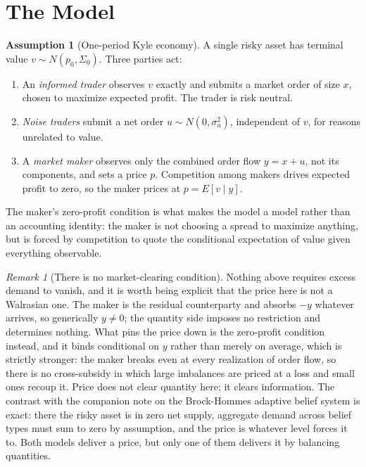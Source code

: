 \documentclass[11pt]{article}
\theoremstyle{remark}
\newtheorem*{remark}{Remark}
\theoremstyle{definition}
\newtheorem{assumption}{Assumption}
\begin{document}
\section{The Model}
\label{sec:model}

\begin{assumption}[One-period Kyle economy]
\label{ass:model}
A single risky asset has terminal value $v \sim N(p_0, \Sigma_0)$. Three parties act:
\begin{enumerate}
\item An \emph{informed trader} observes $v$ exactly and submits a market order of size $x$, chosen to maximize expected profit. The trader is risk neutral.
\item \emph{Noise traders} submit a net order $u \sim N(0,\sigma_u^2)$, independent of $v$, for reasons unrelated to value.
\item A \emph{market maker} observes only the combined order flow $y = x + u$, not its components, and sets a price $p$. Competition among makers drives expected profit to zero, so the maker prices at $p = E[v \mid y]$.
\end{enumerate}
\end{assumption}

The maker's zero-profit condition is what makes the model a model rather than an accounting identity: the maker is not choosing a spread to maximize anything, but is forced by competition to quote the conditional expectation of value given everything observable.

\begin{remark}[There is no market-clearing condition]
\label{rem:clearing}
Nothing above requires excess demand to vanish, and it is worth being explicit that the price here is not a Walrasian one. The maker is the residual counterparty and absorbs $-y$ whatever arrives, so generically $y \ne 0$; the quantity side imposes no restriction and determines nothing. What pins the price down is the zero-profit condition instead, and it binds conditional on $y$ rather than merely on average, which is strictly stronger: the maker breaks even at every realization of order flow, so there is no cross-subsidy in which large imbalances are priced at a loss and small ones recoup it. Price does not clear quantity here; it clears information. The contrast with the companion note on the Brock-Hommes adaptive belief system is exact: there the risky asset is in zero net supply, aggregate demand across belief types must sum to zero by assumption, and the price is whatever level forces it to. Both models deliver a price, but only one of them delivers it by balancing quantities.
\end{remark}
\end{document}
